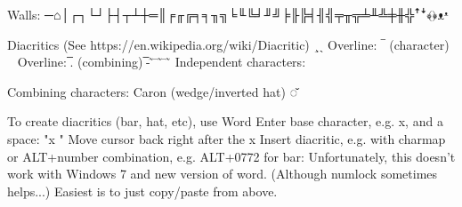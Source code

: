     Walls:
    ─⌂│┌┐└┘├┤┬┴┼═║╒╓╔╕╕╖╗╘╙╚╛╜╝╞╟╠╡╢╣╤╥╦╧╨╩╪╫╬ꜛꜜ﴾﴿ᴥᵜ

    Diacritics  (See https://en.wikipedia.org/wiki/Diacritic)
        ¸ˎ
        Overline: ‾  (character)  ~
        Overline: ̅.  (combining)  ̅-  ̃ ̄  ̃  ̄   ̃
        Independent characters:

        Combining characters:
            Caron (wedge/inverted hat) ◌̌
            

To create diacritics (bar, hat, etc), use Word
    Enter base character, e.g. x, and a space: "x "
    Move cursor back right after the x
    Insert diacritic, e.g. with charmap or ALT+number combination, e.g. ALT+0772 for bar:
    Unfortunately, this doesn't work with Windows 7 and new version of word.
    (Although numlock sometimes helps...)
    Easiest is to just copy/paste from above.

